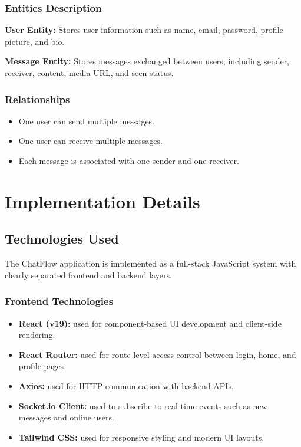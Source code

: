 \documentclass[12pt,a4paper]{report}
\begin{document}

\subsection{Entities Description}

\textbf{User Entity:}
Stores user information such as name, email, password, profile picture, and bio.

\textbf{Message Entity:}
Stores messages exchanged between users, including sender, receiver, content, media URL, and seen status.

\subsection{Relationships}

\begin{itemize}
    \item One user can send multiple messages.
    \item One user can receive multiple messages.
    \item Each message is associated with one sender and one receiver.
\end{itemize}


\chapter{Implementation Details}

\section{Technologies Used}
The ChatFlow application is implemented as a full-stack JavaScript system with clearly separated frontend and backend layers.

\subsection{Frontend Technologies}
\begin{itemize}
    \item \textbf{React (v19):} used for component-based UI development and client-side rendering.
    \item \textbf{React Router:} used for route-level access control between login, home, and profile pages.
    \item \textbf{Axios:} used for HTTP communication with backend APIs.
    \item \textbf{Socket.io Client:} used to subscribe to real-time events such as new messages and online users.
    \item \textbf{Tailwind CSS:} used for responsive styling and modern UI layouts.
\end{itemize}
\end{document}
